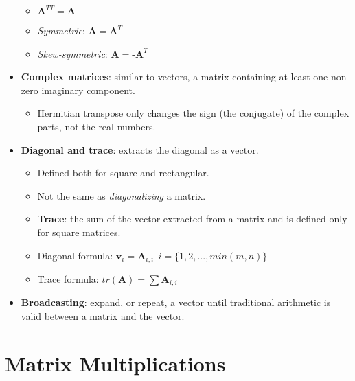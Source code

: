 \documentclass[12pt,a4paper]{article}
\begin{document}
\begin{itemize}
\begin{itemize}
            \item \(\textbf{A}^{TT} = \textbf{A}\)
            \item \textit{Symmetric}: \(\textbf{A} = \textbf{A}^T\)
            \item \textit{Skew-symmetric}: \(\textbf{A} = \textbf{-A}^T\)
        \end{itemize}
    \item \textbf{Complex matrices}: similar to vectors, a matrix containing at least one non-zero imaginary component.
        \begin{itemize}
            \item Hermitian transpose only changes the sign (the conjugate) of the complex parts, not the real numbers.
        \end{itemize}
    \item \textbf{Diagonal and trace}: extracts the diagonal as a vector.
        \begin{itemize}
            \item Defined both for square and rectangular.
            \item Not the same as \textit{diagonalizing} a matrix.
            \item \textbf{Trace}: the sum of the vector extracted from a matrix and is defined only for square matrices.
            \item Diagonal formula: {\color{o-Sun}\(\textbf{v}_i = \textbf{A}_{i,i}~~ i = \{1,2,...,min(m,n)\}\)}
            \item Trace formula: {\color{o-Sun}\(tr(\textbf{A})= \sum \textbf{A}_{i, i}\)}
        \end{itemize}
    \item \textbf{Broadcasting}: expand, or repeat, a vector until traditional arithmetic is valid between a matrix and the vector.
\end{itemize}


\clearpage
\section{Matrix Multiplications}
\end{document}
